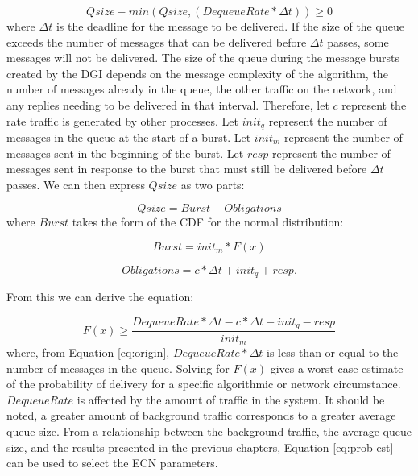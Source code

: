\begin{equation}
Qsize - min(Qsize, (DequeueRate * \Delta t)) \geq 0
\label{eq:origin}
\end{equation}%
where $\Delta t$ is the deadline for the message to be delivered.
If the size of the queue exceeds the number of messages that can be delivered before $\Delta t$ passes, some messages will not be delivered.
The size of the queue during the message bursts created by the DGI depends on the message complexity of the algorithm, the number of messages already in the queue, the other traffic on the network, and any replies needing to be delivered in that interval.
Therefore, let $c$ represent the rate traffic is generated by other processes.
Let $init_q$ represent the number of messages in the queue at the start of a burst. 
Let $init_m$ represent the number of messages sent in the beginning of the burst.
Let $resp$ represent the number of messages sent in response to the burst that must still be delivered before $\Delta t$ passes.
We can then express $Qsize$ as two parts:

\begin{equation}
Qsize = Burst + Obligations
\end{equation}%
where $Burst$ takes the form of the \ac{CDF} for the normal distribution:

\begin{equation}
Burst = init_m * F(x)  
\end{equation}

\begin{equation}
Obligations = c * \Delta t + init_q + resp.
\end{equation}

From this we can derive the equation:

\begin{equation}
F(x) \geq \frac{DequeueRate * \Delta t - c * \Delta t - init_q - resp}{init_m}
\label{eq:prob-est}
\end{equation}%
where, from Equation \ref{eq:origin}, $DequeueRate * \Delta t$ is less than or equal to the number of messages in the queue. 
Solving for $F(x)$ gives a worst case estimate of the probability of delivery for a specific algorithmic or network circumstance.
$DequeueRate$ is affected by the amount of traffic in the system. 
It should be noted, a greater amount of background traffic corresponds to a greater average queue size.
From a relationship between the background traffic, the average queue size, and the results presented in the previous chapters, Equation \ref{eq:prob-est} can be used to select the ECN parameters.

